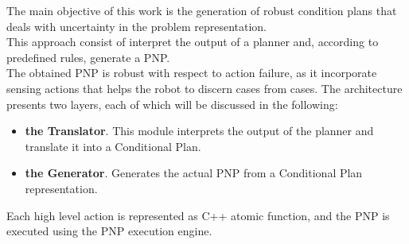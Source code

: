\documentclass[pdftex,12pt,a4paper]{report}
\begin{document}
\noindent The main objective of this work is the generation of robust condition plans that deals with uncertainty in the problem representation.\\
This approach consist of interpret the output of a planner and, according to predefined rules, generate a PNP.\\
The obtained PNP is robust with respect to action failure, as it incorporate sensing actions that helps the robot to discern cases from cases.
The architecture presents two layers, each of which will be discussed in the following:
\begin{itemize}
\item \textbf{the Translator}. This module interprets the output of the planner and translate it into a Conditional Plan.
\item \textbf{the Generator}. Generates the actual PNP from a Conditional Plan representation.
\end{itemize}
Each high level action is represented as C++ atomic function, and the PNP is executed using the PNP execution engine.
\end{document}
